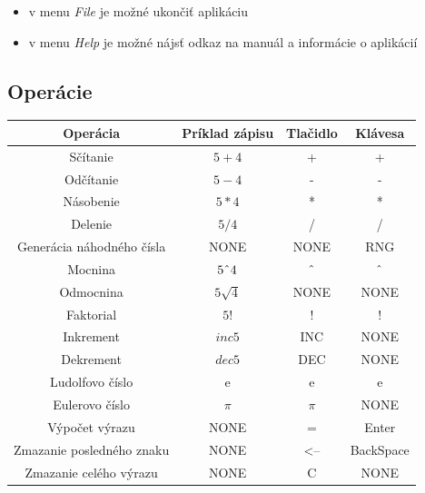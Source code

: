 \documentclass[a4paper, 11pt]{article}
\begin{document}
    \begin{itemize}
        \item v menu \emph{File} je možné ukončiť aplikáciu
        \item v menu \emph{Help} je možné nájsť odkaz na manuál a informácie o aplikácií
    \end{itemize}
    \newpage
    \subsection{Operácie}
    \begin{center}
    \begin{tabular}{ |c|c|c|c| } 
         \hline
         \textbf{Operácia} & \textbf{Príklad zápisu} & \textbf{Tlačidlo} & \textbf{Klávesa} \\ \hline
         Sčítanie &  $5+4$ & + & + \\ \hline
         Odčítanie & $5-4$ & - & - \\ \hline
         Násobenie & $5*4$ & * & *\\ \hline
         Delenie & $5/4$ & / & / \\ \hline
         Generácia náhodného čísla & NONE & NONE & RNG\\ \hline
         Mocnina & $5{\mathchar"5E}4$ & ${\mathchar"5E}$ & ${\mathchar"5E}$\\ \hline
         Odmocnina & $5 \sqrt 4$ & NONE & NONE\\ \hline
         Faktorial & $ 5! $ & ! & !\\ \hline
         Inkrement & $inc5$ & INC & NONE \\ \hline
         Dekrement & $dec5$ & DEC & NONE\\ \hline
         Ludolfovo číslo & e & e & e\\ \hline
         Eulerovo číslo & $\pi$ & $\pi$ & NONE\\ \hline
         Výpočet výrazu & NONE & = & Enter\\ \hline
         Zmazanie posledného znaku & NONE & <-- & BackSpace\\ \hline
         Zmazanie celého výrazu & NONE & C & NONE \\ \hline
    \end{tabular}
    \end{center}
\end{document}
